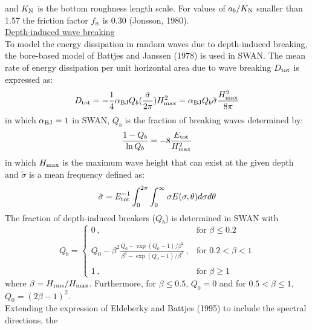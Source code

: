 \documentclass[12pt]{book}
\begin{document}
and $K_{\rm N}$ is the bottom roughness length scale. For values of $a_b/K_{\rm N}$ smaller than 1.57 the
friction factor $f_w$ is 0.30 (Jonsson, 1980).
\nocite{Jon76C,Jon80}
\\[2ex]
\noindent
\underline{Depth-induced wave breaking}\\[2ex]
To model the energy dissipation in random waves due to depth-induced breaking, the bore-based model
of Battjes and Janssen (1978) is used in SWAN. The mean rate of energy dissipation per unit horizontal
area due to wave breaking $D_{\rm tot}$ is expressed as:
\begin{equation}
  D_{\rm tot} = - \frac{1}{4} \alpha_{\rm BJ} Q_b (\frac{\tilde{\sigma}}{2\pi}) H^2_{\rm max}
              = \alpha_{\rm BJ} Q_b \tilde{\sigma} \frac{H^2_{\rm max}}{8\pi}
  \label{eq3-22}
\end{equation}
in which $\alpha_{\rm BJ} = 1$ in SWAN, $Q_b$ is the fraction of breaking waves determined by:
\begin{equation}
  \frac{1 - Q_b}{\ln Q_b} = -8 \frac{E_{\rm tot}}{H_{\rm max}^2}
  \label{eq3-23}
\end{equation}
in which $H_{\rm max}$ is the maximum wave height that can exist at the given depth and ${\tilde{\sigma}}$
is a mean frequency defined as:
\begin{equation}
  \tilde{\sigma} = E^{-1}_{\rm tot} \int_{0}^{2\pi} \int_{0}^{\infty} \sigma E(\sigma,\theta) d\sigma d\theta
  \label{eq3-24}
\end{equation}
The fraction of depth-induced breakers ($Q_b$) is determined in SWAN with
\begin{equation}
   Q_b =
    \left\{
      \begin{array}{ll}
         0 \, , & \mbox{for } \beta \leq 0.2 \\
         \\
         Q_0 - \beta^2 \frac{Q_0 - \exp{(Q_0 - 1)/\beta^2}}{\beta^2 - \exp{(Q_0 - 1)/\beta^2}}
         \, , & \mbox{for }  0.2 < \beta < 1\\
         \\
         1 \, , & \mbox{for }  \beta \geq 1
      \end{array}
    \right.
  \label{eq3-25}
\end{equation}
where $\beta = H_{\rm rms}/H_{\rm max}$. Furthermore, for $\beta \leq 0.5$, $Q_0 = 0$ and for
$0.5 < \beta \leq 1$, $Q_0 = (2\beta-1)^2$.
\\[2ex]
\noindent
Extending the expression of Eldeberky and Battjes (1995) to include the spectral directions, the
\end{document}
